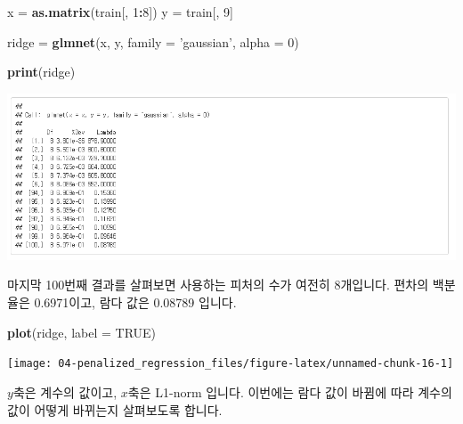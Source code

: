 \documentclass[12pt,]{book}
\newenvironment{Shaded}{\begin{snugshade}}{\end{snugshade}}
\newcommand{\DataTypeTok}[1]{\textcolor[rgb]{0.13,0.29,0.53}{#1}}
\newcommand{\DecValTok}[1]{\textcolor[rgb]{0.00,0.00,0.81}{#1}}
\newcommand{\KeywordTok}[1]{\textcolor[rgb]{0.13,0.29,0.53}{\textbf{#1}}}
\newcommand{\NormalTok}[1]{#1}
\newcommand{\OperatorTok}[1]{\textcolor[rgb]{0.81,0.36,0.00}{\textbf{#1}}}
\newcommand{\OtherTok}[1]{\textcolor[rgb]{0.56,0.35,0.01}{#1}}
\newcommand{\StringTok}[1]{\textcolor[rgb]{0.31,0.60,0.02}{#1}}
\begin{document}
\begin{Shaded}
\begin{Highlighting}[]
\NormalTok{x =}\StringTok{ }\KeywordTok{as.matrix}\NormalTok{(train[, }\DecValTok{1}\OperatorTok{:}\DecValTok{8}\NormalTok{])}
\NormalTok{y =}\StringTok{ }\NormalTok{train[, }\DecValTok{9}\NormalTok{]}

\NormalTok{ridge =}\StringTok{ }\KeywordTok{glmnet}\NormalTok{(x, y, }\DataTypeTok{family =} \StringTok{'gaussian'}\NormalTok{, }\DataTypeTok{alpha =} \DecValTok{0}\NormalTok{)}
\end{Highlighting}
\end{Shaded}

\begin{Shaded}
\begin{Highlighting}[]
\KeywordTok{print}\NormalTok{(ridge)}
\end{Highlighting}
\end{Shaded}

\begin{center}\includegraphics[width=1\linewidth]{images/ridge} \end{center}

마지막 100번째 결과를 살펴보면 사용하는 피처의 수가 여전히 8개입니다. 편차의 백분율은 0.6971이고, 람다 값은 0.08789 입니다.

\begin{Shaded}
\begin{Highlighting}[]
\KeywordTok{plot}\NormalTok{(ridge, }\DataTypeTok{label =} \OtherTok{TRUE}\NormalTok{)}
\end{Highlighting}
\end{Shaded}

\begin{center}\texttt{[image: 04-penalized\_regression\_files/figure-latex/unnamed-chunk-16-1]} \end{center}

\(y\)축은 계수의 값이고, \(x\)축은 L1-norm 입니다. 이번에는 람다 값이 바뀜에 따라 계수의 값이 어떻게 바뀌는지 살펴보도록 합니다.
\end{document}
